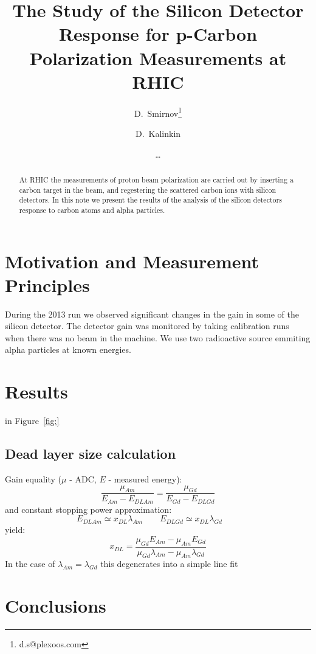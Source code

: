 \documentclass[a4paper]{article}
\title{The Study of the Silicon Detector Response for p-Carbon Polarization Measurements at RHIC}
\author[1]{D.~Smirnov\thanks{d.s@plexoos.com}}
\author[2]{D.~Kalinkin}
\author[]{\ldots}
\affil[1]{Brookhaven National Lab}
\affil[2]{ITEP}
\begin{document}
\maketitle

\begin{abstract}
At RHIC the measurements of proton beam polarization are carried out
by inserting a carbon target in the beam, and regestering the scattered carbon
ions with silicon detectors. In this note we present the results of the
analysis of the silicon detectors response to carbon atoms and alpha particles.
\end{abstract}

\section{Motivation and Measurement Principles}

During the 2013 run we observed significant changes in the gain in some of the
silicon detector. The detector gain was monitored by taking calibration runs
when there was no beam in the machine. We use two radioactive source emmiting
alpha particles at known energies.


\section{Results}

in Figure~\ref{fig:}

\subsection{Dead layer size calculation}

\noindent Gain equality ($\mu$ - ADC, $E$ - measured energy):
\begin{equation}
\frac{\mu_{Am}}{E_{Am} - E_{DLAm}} = \frac{\mu_{Gd}}{E_{Gd} - E_{DLGd}}
\end{equation}
and constant stopping power approximation:
\begin{equation}
E_{DLAm} \simeq x_{DL} \lambda_{Am}\qquad
E_{DLGd} \simeq x_{DL} \lambda_{Gd}\qquad
\end{equation}
yield:
\begin{equation}
x_{DL} = \frac{\mu_{Gd} E_{Am} - \mu_{Am} E_{Gd}}{\mu_{Gd}\lambda_{Am} - \mu_{Am}\lambda_{Gd}}
\end{equation}
In the case of $\lambda_{Am}=\lambda_{Gd}$ this degenerates into a simple line fit

\section{Conclusions}
\end{document}
